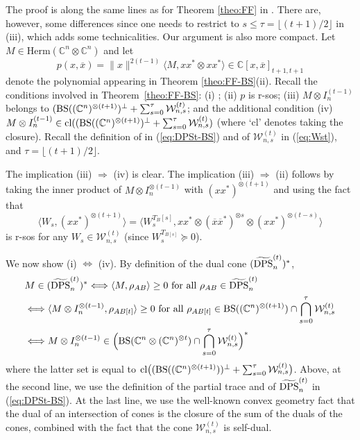 \documentclass[11pt]{article}
\makeatletter
\newcommand{\C}{\ensuremath{\mathbb{C}}} %
\newcommand{\MW}{{\mathcal W}}
\newcommand{\Herm}{\mathrm{Herm}}
\newcommand{\Cnn}{\C^n\ot \C^n}
\newcommand{\Cnnt}{\C^n\ot (\C^n)^{\ot t}}
\newcommand{\DPS}{\text{\rm DPS}}
\newcommand{\tilDPSt}{\widetilde{\DPS}^{(t)}}
\newcommand{\ot}{\otimes}
\newcommand{\BS}{\text{\rm BS}}
\newcommand{\ovx}{\overline x}
\newcommand{\tftwo}{{\lfloor (t+1)/2\rfloor}}
\theoremstyle{plain}
\renewenvironment{proof}[1][\proofname]{%
  \par
  \pushQED{}%
  \normalfont
  \topsep6\p@\@plus6\p@
  \trivlist
  \item[\hskip\labelsep\itshape #1\@addpunct{.}]%
}{%
  \popQED
  \endtrivlist
}
\makeatother
\begin{document}
\begin{proof}[Proof of Theorem \ref{theo:FF-BS}] %
The proof is along the same lines as for Theorem \ref{theo:FF} in \cite{FF-sphere}. There are, however,   some differences since one needs  to restrict to $s\le \tau=\lfloor(t+1)/2\rfloor$ in (iii), which adds some technicalities. Our argument is also more compact.
Let $M\in \Herm(\Cnn)$ and let $$p(x,\ovx)=\|x\|^{2(t-1)} \langle M, xx^*\ot xx^*\rangle\in\C[x,\ovx]_{t+1,t+1}$$ denote the polynomial appearing in Theorem \ref{theo:FF-BS}(ii).
Recall the conditions involved in  Theorem~\ref{theo:FF-BS}: (i) \smash{$M\in(\tilDPSt_n)^*$}; (ii) $p$ is r-sos; 
(iii)  $M\ot I_n^{(t-1)}$ belongs to $ (\BS((\C^n)^{\ot (t+1)})^\perp+\sum_{s=0}^{\tau} \MW^{(t)}_{n,s}$; and the additional condition (iv) $M\ot I_n^{(t-1)}\in \text{\rm cl}((\BS((\C^n)^{\ot (t+1)})^\perp+\sum_{s=0}^\tau \MW^{(t)}_{n,s})$ (where `cl' denotes taking the closure).
Recall the definition of \smash{$\tilDPSt_n$} in (\ref{eq:DPSt-BS}) and of   $\MW^{(t)}_{n,s}$ in  (\ref{eq:Wst}), and   $\tau=\tftwo$.

\medskip
The implication  (iii) $\Longrightarrow$ (iv) is clear. The implication (iii) $\Longrightarrow$ (ii) follows by taking the inner product of $M\ot I_n^{\ot (t-1)}$  with $(xx^*)^{\ot (t+1)}$ and using the fact that 
$$\langle W_s, (xx^*)^{\ot (t+1)}\rangle=\langle W_s^{T_B[s]}, xx^* \ot (\ovx \ovx ^*)^{\ot s}\ot (xx^*)^{\ot (t-s)}\rangle$$ is r-sos for any $W_s\in \MW^{(t)}_{n,s}$ (since $W_s^{T_{B[s]}}\succeq 0$).%



\medskip
We now show     (i) $\Longleftrightarrow$ (iv). 
By definition of the dual cone $(\tilDPSt_n)^*$,  
\begin{align*}
&M\in (\tilDPSt_n)^* \Longleftrightarrow \langle M, \rho_{AB}\rangle\geq0 \text{ for all } \rho_{AB}\in \tilDPSt_n\\
& \Longleftrightarrow 
\langle M\ot I_n^{\ot (t-1)}, \rho_{AB[t]}\rangle\geq0 \text{ for all }   
\rho_{AB[t]} \in \BS((\C^n)^{\ot (t+1)})\cap \bigcap_{s=0}^\tau \MW^{(t)}_{n,s}\\
& \Longleftrightarrow M\ot I_n^{\ot (t-1)} \in \Big(\BS(\Cnnt) \cap \bigcap_{s=0}^\tau \MW^{(t)}_{n,s}\Big)^*
\end{align*}
where the latter set is equal to
$ \text{cl}\big((\BS((\C^n)^{\ot (t+1)}))^{\perp} +\sum_{s=0}^\tau \MW^{(t)}_{n,s}\big)$.
 Above, at the second line, we use the definition of the partial trace and of  {$\tilDPSt_n$} in (\ref{eq:DPSt-BS}).
 At the last line, we use the well-known convex geometry fact that the dual of an intersection of cones is the closure of the sum of the duals of the cones, combined with the fact that the cone $\MW^{(t)}_{n,s}$ is self-dual.



\end{proof}
\end{document}
